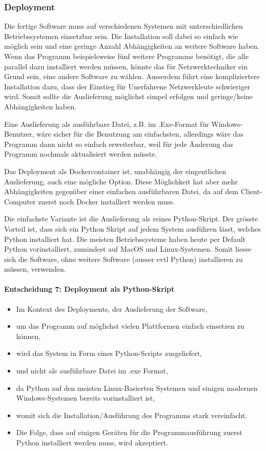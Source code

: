 \documentclass[
	ngerman,
	toc=listof, %
	toc=bibliography, %
	footnotes=multiple, %
	parskip=half, %
	numbers=noendperiod %
]{scrartcl}
\begin{document}
		\subsubsection{Deployment}
		Die fertige Software muss auf verschiedenen Systemen mit unterschiedlichen Betriebssystemen einsetzbar sein.
		Die Installation soll dabei so einfach wie möglich sein und eine geringe Anzahl Abhängigkeiten an weitere Software haben.
		Wenn das Programm beispielsweise fünf weitere Programme benötigt, die alle parallel dazu installiert werden müssen, könnte das für Netzwerktechniker ein Grund sein, eine andere Software zu wählen.
		Ausserdem führt eine kompliziertere Installation dazu, dass der Einstieg für Unerfahrene Netzwerkleute schwieriger wird.
		Somit sollte die Auslieferung möglichst simpel erfolgen und geringe/keine Abhängigkeiten haben.
		
		Eine Auslieferung als ausführbare Datei, z.B. im .Exe-Format für Windows-Benutzer, wäre sicher für die Benutzung am einfachsten,
		allerdings wäre das Programm dann nicht so einfach erweiterbar, weil für jede Änderung das Programm nochmals aktualisiert werden müsste.

		Das Deployment als Dockercontainer ist, unabhängig der eingentlichen Auslieferung, auch eine mögliche Option.
		Diese Möglichkeit hat aber mehr Abhängigkeiten gegenüber einer einfachen ausführbaren Datei, da auf dem Client-Computer zuerst noch Docker installiert werden muss.
		
		Die einfachste Variante ist die Auslieferung als reines Python-Skript. Der grösste Vorteil ist, dass sich ein Python Skript auf jedem System ausführen lässt, welches Python installiert hat.
		Die meisten Betriebssysteme haben heute per Default Python vorinstalliert, zumindest auf MacOS und Linux-Systemen.
		Somit liesse sich die Software, ohne weitere Software (ausser evtl Python) installieren zu müssen, verwenden.

		\paragraph{Entscheidung 7: Deployment als Python-Skript}
		\begin{itemize}
			\item Im Kontext des Deployments, der Auslieferung der Software,
			\item um das Programm auf möglichst vielen Plattformen einfach einsetzen zu können,
			\item wird das System in Form eines Python-Scripts ausgeliefert,
			\item und nicht als ausführbare Datei im .exe Format,
			\item da Python auf den meisten Linux-Basierten Systemen und einigen modernen Windows-Systemen bereits vorinstalliert ist,
			\item womit sich die Installation/Ausführung des Programms stark vereinfacht.
			\item Die Folge, dass auf einigen Geräten für die Programmausführung zuerst Python installiert werden muss, wird akzeptiert.
		\end{itemize}
\end{document}
